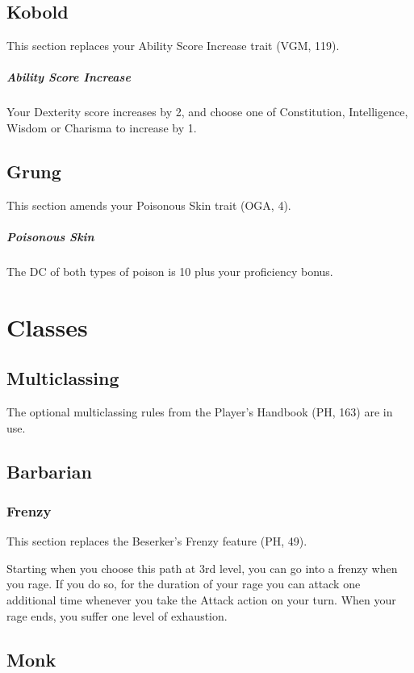 \documentclass[letterpaper,twocolumn,openany,nodeprecatedcode]{dndbook}
\begin{document}
\subsection{Kobold}
This section replaces your Ability Score Increase trait (VGM, 119).

\subparagraph{Ability Score Increase} Your Dexterity score increases by 2, and choose one of Constitution, Intelligence, Wisdom or Charisma to increase by 1.

\subsection{Grung}
This section amends your Poisonous Skin trait (OGA, 4).

\subparagraph{Poisonous Skin} The DC of both types of poison is 10 plus your proficiency bonus.




\section{Classes}

\subsection{Multiclassing}
The optional multiclassing rules from the Player's Handbook (PH, 163) are in use.

\subsection{Barbarian}

\subsubsection{Frenzy}
This section replaces the Beserker's Frenzy feature (PH, 49).

Starting when you choose this path at 3rd level, you can go into a frenzy when you rage. If you do so, for the duration of your rage you can attack one additional time whenever you take the Attack action on your turn. When your rage ends, you suffer one level of exhaustion.

\subsection{Monk}
\end{document}
